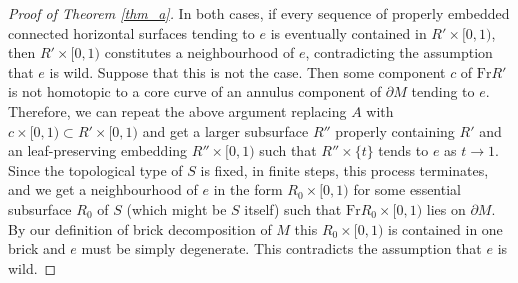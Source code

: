 \documentclass{amsart}
\theoremstyle{definition}
\numberwithin{figure}{section}
\numberwithin{equation}{section}
\newcommand{\Fr}{\mathrm{Fr}}
\def\part{\partial}
\begin{document}
\begin{proof}[Proof of Theorem \ref{thm_a}]
In both  cases, if every sequence of properly embedded connected horizontal surfaces tending to $e$ is eventually contained in $R' \times [0,1)$, then $R' \times [0,1)$ constitutes a neighbourhood of $e$, contradicting the assumption that $e$ is wild.
Suppose that this is not the case.
Then some component $c$ of  $\Fr R'$ is not homotopic to a core curve of an annulus component of $\partial M$ tending to $e$.
Therefore, we can repeat the above argument replacing $A$ with $c\times [0,1) \subset R' \times [0,1)$ and get a larger subsurface $R''$ properly containing $R'$ and an leaf-preserving embedding $R'' \times [0,1)$ such that $R'' \times \{t\}$ tends to $e$ as $t \rightarrow 1$.
Since the topological type of $S$ is fixed, in finite steps, this process terminates, and we get a neighbourhood of $e$ in the form $R_0 \times [0,1)$ for some essential subsurface $R_0$ of $S$ (which might be $S$ itself) such that $\Fr R_0 \times [0,1)$ lies on $\partial M$.
By our definition of brick decomposition of $M$ this $R_0 \times [0,1)$ is contained in one brick and $e$ must be simply degenerate.
This contradicts the assumption that $e$ is wild. 
%
%
%

\end{proof}
\end{document}
